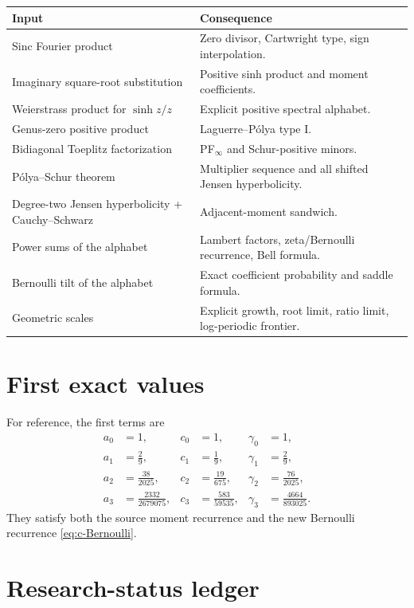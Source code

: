 \documentclass[11pt]{article}
\numberwithin{equation}{section}
\theoremstyle{definition}
\theoremstyle{remark}
\begin{document}
\begin{center}
\begin{tabularx}{\textwidth}{>{\raggedright\arraybackslash}p{}X}
\toprule
Input & Consequence \\
\midrule
Sinc Fourier product & Zero divisor, Cartwright type, sign interpolation.\\
Imaginary square-root substitution & Positive sinh product and moment coefficients.\\
Weierstrass product for $\sinh z/z$ & Explicit positive spectral alphabet.\\
Genus-zero positive product & Laguerre--Pólya type I.\\
Bidiagonal Toeplitz factorization & PF$_\infty$ and Schur-positive minors.\\
Pólya--Schur theorem & Multiplier sequence and all shifted Jensen hyperbolicity.\\
Degree-two Jensen hyperbolicity + Cauchy--Schwarz & Adjacent-moment sandwich.\\
Power sums of the alphabet & Lambert factors, zeta/Bernoulli recurrence, Bell formula.\\
Bernoulli tilt of the alphabet & Exact coefficient probability and saddle formula.\\
Geometric scales & Explicit growth, root limit, ratio limit, log-periodic frontier.\\
\bottomrule
\end{tabularx}
\end{center}

\section{First exact values}

For reference, the first terms are
\begin{align*}
 a_0&=1,& c_0&=1,&\gamma_0&=1,\\
 a_1&=\frac29,& c_1&=\frac19,&\gamma_1&=\frac29,\\
 a_2&=\frac{38}{2025},&c_2&=\frac{19}{675},&\gamma_2&=\frac{76}{2025},\\
 a_3&=\frac{2332}{2679075},&c_3&=\frac{583}{59535},&
 \gamma_3&=\frac{4664}{893025}.
\end{align*}
They satisfy both the source moment recurrence and the new Bernoulli recurrence \eqref{eq:c-Bernoulli}.

\section{Research-status ledger}
\end{document}
